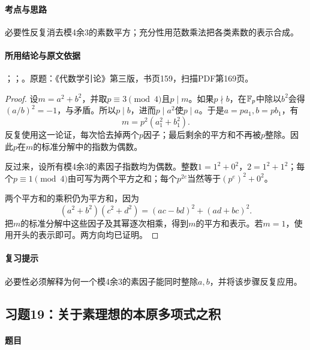 \paragraph{考点与思路}

必要性反复消去模4余3的素数平方；充分性用范数乘法把各类素数的表示合成。

\paragraph{所用结论与原文依据}

；；。原题：《代数学引论》第三版，书页159，扫描PDF第169页。


\begin{proof}

设$m=a^2+b^2$，并取$p\equiv3\pmod4$且$p\mid m$。如果$p\nmid b$，在$\mathbb F_p$中除以$b^2$会得$(a/b)^2=-1$，与矛盾。所以$p\mid b$，进而$p\mid a^2$使$p\mid a$。于是$a=pa_1,b=pb_1$，有
\[
m=p^2(a_1^2+b_1^2).
\]
反复使用这一论证，每次恰去掉两个$p$因子；最后剩余的平方和不再被$p$整除。因此$p$在$m$的标准分解中的指数为偶数。

反过来，设所有模4余3的素因子指数均为偶数。整数$1=1^2+0^2$，$2=1^2+1^2$；每个$p\equiv1\pmod4$由可写为两个平方之和；每个$p^{2e}$当然等于$(p^e)^2+0^2$。

两个平方和的乘积仍为平方和，因为
\[
(a^2+b^2)(c^2+d^2)=(ac-bd)^2+(ad+bc)^2.
\]
把$m$的标准分解中这些因子及其幂逐次相乘，得到$m$的平方和表示。若$m=1$，使用开头的表示即可。两方向均已证明。

\end{proof}

\paragraph{复习提示}

必要性必须解释为何一个模4余3的素因子能同时整除$a,b$，并将该步骤反复应用。

\subsection{习题19：关于素理想的本原多项式之积}

\label{ex:4:19}

\paragraph{题目}

